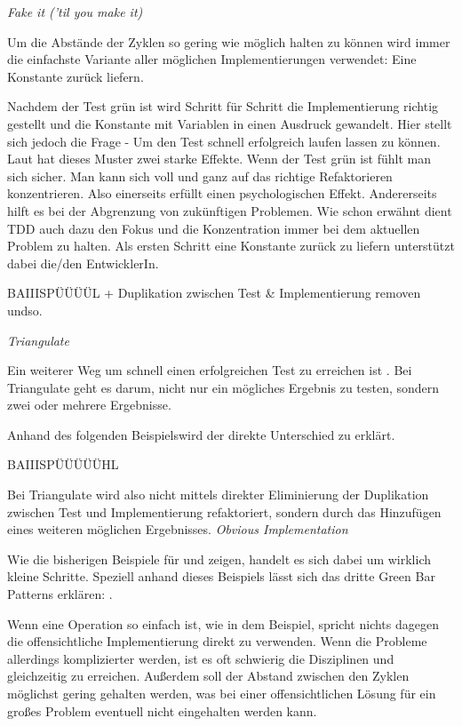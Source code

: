 \textit{Fake it ('til you make it)}

Um die Abstände der  Zyklen so gering wie möglich halten zu können wird immer die einfachste Variante aller möglichen Implementierungen verwendet: Eine Konstante zurück liefern.

Nachdem der Test grün ist wird Schritt für Schritt die Implementierung richtig gestellt und die Konstante mit Variablen in einen Ausdruck gewandelt. Hier stellt sich jedoch die Frage  - Um den Test schnell erfolgreich laufen lassen zu können.
Laut \cite[152]{Beck:2003} hat dieses Muster zwei starke Effekte. Wenn der Test grün ist fühlt man sich sicher. Man kann sich voll und ganz auf das richtige Refaktorieren konzentrieren. Also einerseits erfüllt  einen psychologischen Effekt. Andererseits hilft es bei der Abgrenzung von zukünftigen Problemen. Wie schon erwähnt dient TDD auch dazu den Fokus und die Konzentration immer bei dem aktuellen Problem zu halten. Als ersten Schritt eine Konstante zurück zu liefern unterstützt dabei die/den EntwicklerIn.

BAIIISPÜÜÜÜL + Duplikation zwischen Test \& Implementierung removen undso.\newline\newline

\textit{Triangulate}

Ein weiterer Weg um schnell einen erfolgreichen Test zu erreichen ist . Bei Triangulate geht es darum, nicht nur ein mögliches Ergebnis zu testen, sondern zwei oder mehrere Ergebnisse.

Anhand des folgenden Beispielswird der direkte Unterschied zu  erklärt.

BAIIISPÜÜÜÜÜHL

Bei Triangulate wird also nicht mittels direkter Eliminierung der Duplikation zwischen Test und Implementierung refaktoriert, sondern durch das Hinzufügen eines weiteren möglichen Ergebnisses.\newline\newline
\newpage
\textit{Obvious Implementation}

Wie die bisherigen Beispiele für  und  zeigen, handelt es sich dabei um wirklich kleine Schritte. Speziell anhand dieses Beispiels lässt sich das dritte Green Bar Patterns erklären: .

Wenn eine Operation so einfach ist, wie in dem Beispiel, spricht nichts dagegen die offensichtliche Implementierung direkt zu verwenden.
Wenn die Probleme allerdings komplizierter werden, ist es oft schwierig die Disziplinen  und  gleichzeitig zu erreichen. Außerdem soll der Abstand zwischen den Zyklen möglichst gering gehalten werden, was bei einer offensichtlichen Lösung für ein großes Problem eventuell nicht eingehalten werden kann.

